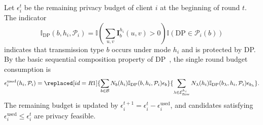 ﻿\documentclass[preprint,12pt]{elsarticle}
\theoremstyle{plain}
\theoremstyle{definition}
\theoremstyle{remark}
\begin{document}
Let \(\epsilon_i^t\) be the remaining privacy budget of client \(i\) at the beginning of round \(t\).
The indicator
\begin{equation}
\mathbb{I}_{\mathrm{DP}}(b,h_i,\mathcal{P}_i)
=
\mathbb{I}\left(\sum_{u,v}\mathbf{I}_{b}^{h_i}(u,v)>0\right)
\mathbb{I}\left(\mathrm{DP}\in\mathcal{P}_i(b)\right)
\end{equation}
indicates that transmission type \(b\) occurs under mode \(h_i\) and is protected by DP.
By the basic sequential composition property of DP~\cite{dwork2014the}, the single round budget consumption is
\begin{equation}
    \epsilon_i^{\mathrm{used}}(h_i,\mathcal{P}_i)
    =
    \replaced[id=R1]{\sum_{b\in\mathcal{B}}
    N_b(h_i)\mathbb{I}_{\mathrm{DP}}(b,h_i,\mathcal{P}_i)\epsilon_b}
    {\sum_{\lambda\in\mathcal{E}_{\mathrm{flow}}^{h_i}}
    N_{\lambda}(h_i)\mathbb{I}_{\mathrm{DP}}(b_{\lambda},h_i,\mathcal{P}_i)\epsilon_{b_{\lambda}}}.
\label{eq:privacy_budget}
\end{equation}
The remaining budget is updated by \(\epsilon_i^{t+1}=\epsilon_i^t-\epsilon_i^{\mathrm{used}}\), and candidates satisfying \(\epsilon_i^{\mathrm{used}}\le\epsilon_i^t\) are privacy feasible.
\end{document}
